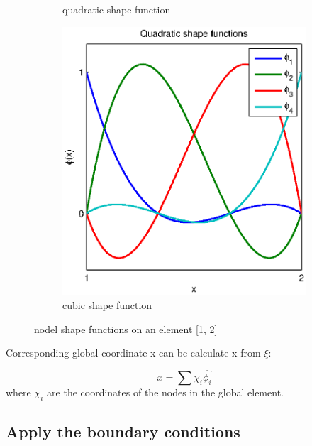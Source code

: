 \documentclass[paper=a4, fontsize=11pt]{article} %
\begin{document}
\begin{figure}
\begin{subfigure}[b]{0.6\textwidth}
                \caption{quadratic shape function}
                \label{fig:quad_shape}
        \end{subfigure}
        \begin{subfigure}[b]{0.6\textwidth}
                \includegraphics[width=\textwidth]{cubic_shape_function.eps}
                \caption{cubic shape function}
                \label{fig:cub_shape}
        \end{subfigure}

        \caption{nodel shape functions on an element [1, 2]}\label{fig:shape}
\end{figure}


Corresponding global coordinate x can be calculate x from $\xi$:

\begin{equation}
x = \sum{\chi _i \hat{\phi _i}}
\end{equation} 
where $\chi_i$ are the coordinates of the nodes in the global element.  

\subsection{Apply the boundary conditions}
\end{document}
